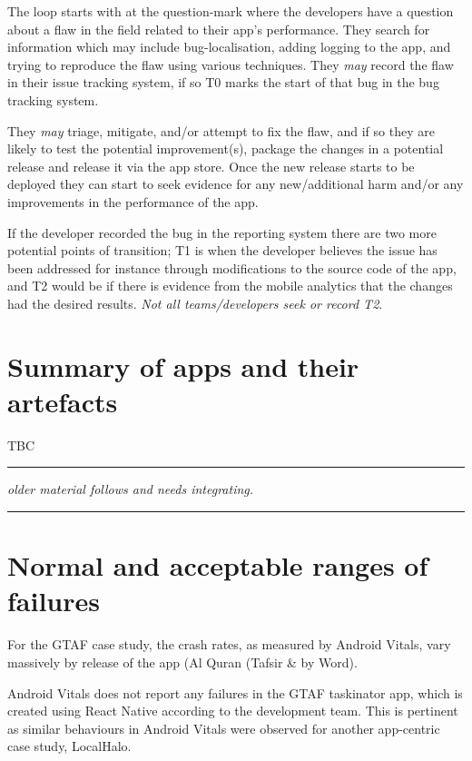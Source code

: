 The loop starts with at the question-mark where the developers have a question about a flaw in the field related to their app's performance. They search for information which may include bug-localisation, adding logging to the app, and trying to reproduce the flaw using various techniques. They \emph{may} record the flaw in their issue tracking system, if so T0 marks the start of that bug in the bug tracking system.

They \emph{may} triage, mitigate, and/or attempt to fix the flaw, and if so they are likely to test the potential improvement(s), package the changes in a potential release and release it via the app store. Once the new release starts to be deployed they can start to seek evidence for any new/additional harm and/or any improvements in the performance of the app.

If the developer recorded the bug in the reporting system there are two more potential points of transition; T1 is when the developer believes the issue has been addressed for instance through modifications to the source code of the app, and T2 would be if there is evidence from the mobile analytics that the changes had the desired results. \emph{Not all teams/developers seek or record T2}.


\section{Summary of apps and their artefacts}
TBC




\noindent\textcolor[RGB]{220,220,220}{\rule{\linewidth}{1pt}}
\emph{older material follows and needs integrating.}

\noindent\textcolor[RGB]{220,220,220}{\rule{\linewidth}{1pt}}


\section{Normal and acceptable ranges of failures}
For the GTAF case study, the crash rates, as measured by Android Vitals, vary massively by release of the app (Al Quran (Tafsir \& by Word). 

Android Vitals does not report any failures in the GTAF taskinator app, which is created using React Native according to the development team. This is pertinent as similar behaviours in Android Vitals were observed for another app-centric case study, LocalHalo. 

